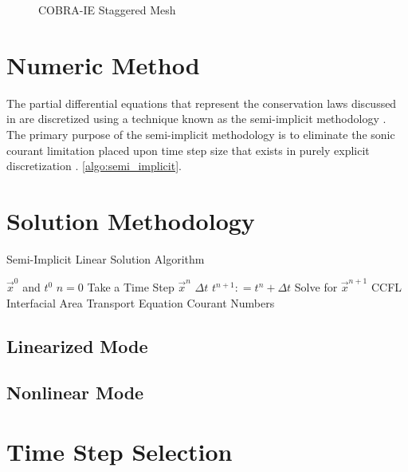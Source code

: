\begin{figure}[ht]
\caption{COBRA-IE Staggered Mesh}
\label{fig:staggered_mesh}
\begin{center}
\end{center}
\end{figure}
 

\section{Numeric Method}
\label{sect:cobra_numeric_method}
The partial differential equations that represent the conservation laws discussed in  are discretized using a technique known as the semi-implicit methodology \cite{Liles1978}.
The primary purpose of the semi-implicit methodology is to eliminate the sonic courant limitation placed upon time step size that exists in purely explicit discretization \cite{someone}. \ref{algo:semi_implicit}.

\section{Solution Methodology}
\label{sect:cobra_solution_methodology}

\begin{algo}[H]
\caption{Semi-Implicit Linear Solution Algorithm}
\label{algo:semi_implicit}
\setlength{\baselineskip}{0.625\baselineskip}
\begin{algorithmic}[1]
\Require $\Vec{x}^{0}$ and $t^{0}$
\Set $n = 0$
\Loop \; Take a Time Step
    \Set $\vec{x}^{n}$        
    \Calculate $\Delta t$ 
    \State $t^{n+1} : = t^{n} + \Delta t$
    \BlackBox Solve for $\vec{x}^{n+1}$ 
    \Test CCFL 
    \BlackBox Interfacial Area Transport Equation
    \Calculate Courant Numbers 
\end{algorithmic}
\end{algo}

\subsection{Linearized Mode}
\label{subsect:solution_linear}


\subsection{Nonlinear Mode}
\label{subsect:solution_nonlinear}

\section{Time Step Selection}
\label{sect:time_step_selection}
